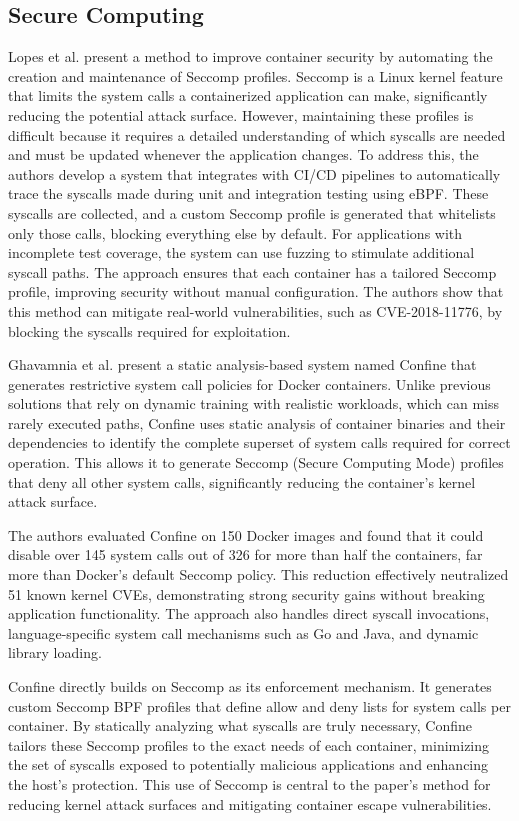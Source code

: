 \documentclass[12pt]{report}
\begin{document}
\begin{doublespace}
\section{Secure Computing}

Lopes et al. \cite{lopes2020container} present a method to improve container security by automating the creation and maintenance of Seccomp profiles. Seccomp is a Linux kernel feature that limits the system calls a containerized application can make, significantly reducing the potential attack surface. However, maintaining these profiles is difficult because it requires a detailed understanding of which syscalls are needed and must be updated whenever the application changes. To address this, the authors develop a system that integrates with CI/CD pipelines to automatically trace the syscalls made during unit and integration testing using eBPF. These syscalls are collected, and a custom Seccomp profile is generated that whitelists only those calls, blocking everything else by default. For applications with incomplete test coverage, the system can use fuzzing to stimulate additional syscall paths. The approach ensures that each container has a tailored Seccomp profile, improving security without manual configuration. The authors show that this method can mitigate real-world vulnerabilities, such as CVE-2018-11776, by blocking the syscalls required for exploitation.

Ghavamnia et al. present a static analysis-based system named Confine that generates restrictive system call policies for Docker containers. Unlike previous solutions that rely on dynamic training with realistic workloads, which can miss rarely executed paths, Confine uses static analysis of container binaries and their dependencies to identify the complete superset of system calls required for correct operation. This allows it to generate Seccomp (Secure Computing Mode) profiles that deny all other system calls, significantly reducing the container’s kernel attack surface.

The authors evaluated Confine on 150 Docker images and found that it could disable over 145 system calls out of 326 for more than half the containers, far more than Docker’s default Seccomp policy. This reduction effectively neutralized 51 known kernel CVEs, demonstrating strong security gains without breaking application functionality. The approach also handles direct syscall invocations, language-specific system call mechanisms such as Go and Java, and dynamic library loading.

Confine directly builds on Seccomp as its enforcement mechanism. It generates custom Seccomp BPF profiles that define allow and deny lists for system calls per container. By statically analyzing what syscalls are truly necessary, Confine tailors these Seccomp profiles to the exact needs of each container, minimizing the set of syscalls exposed to potentially malicious applications and enhancing the host’s protection. This use of Seccomp is central to the paper’s method for reducing kernel attack surfaces and mitigating container escape vulnerabilities.

\end{doublespace} 	\fontsize{12pt}{14pt} \selectfont
\end{document}
